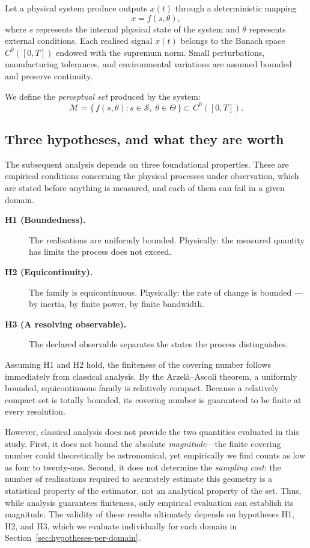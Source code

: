 \documentclass[10pt]{article}
\theoremstyle{plain}
\theoremstyle{definition}
\theoremstyle{remark}
\begin{document}
Let a physical system produce outputs $x(t)$ through a deterministic mapping
\[
x = f(s,\theta),
\]
where $s$ represents the internal physical state of the system and $\theta$ 
represents external conditions. Each realised signal $x(t)$ belongs to the 
Banach space $C^0([0,T])$ endowed with the supremum norm. Small perturbations,
manufacturing tolerances, and environmental variations are assumed bounded and 
preserve continuity.

We define the \emph{perceptual set} produced by the system:
\[
\mathcal{M} = \{\, f(s,\theta) : s\in\mathcal{S},\;\theta \in \Theta \,\}
\subset C^0([0,T]).
\]

\subsection{Three hypotheses, and what they are worth}
\label{sec:hypotheses}

The subsequent analysis depends on three foundational properties. These are
empirical conditions concerning the physical processes under observation, which
are stated before anything is measured, and each of them can fail in a given domain.

\begin{description}
  \item[\textnormal{\textbf{H1 (Boundedness).}}] The realisations are uniformly
    bounded. Physically: the measured quantity has limits the process does not
    exceed.
  \item[\textnormal{\textbf{H2 (Equicontinuity).}}] The family is equicontinuous.
    Physically: the rate of change is bounded --- by inertia, by finite power, by
    finite bandwidth.
  \item[\textnormal{\textbf{H3 (A resolving observable).}}] The declared
    observable separates the states the process distinguishes.
\end{description}

Assuming H1 and H2 hold, the finiteness of the covering number follows
immediately from classical analysis. By the Arzel\`a--Ascoli theorem, a
uniformly bounded, equicontinuous family is relatively compact. Because a
relatively compact set is totally bounded, its covering number is guaranteed
to be finite at every resolution.

However, classical analysis does not provide the two quantities evaluated in
this study. First, it does not bound the absolute \emph{magnitude}---the finite
covering number could theoretically be astronomical, yet empirically we find
counts as low as four to twenty-one. Second, it does not determine the
\emph{sampling cost}: the number of realisations required to accurately
estimate this geometry is a statistical property of the estimator, not an
analytical property of the set. Thus, while analysis guarantees finiteness,
only empirical evaluation can establish its magnitude. The validity of these
results ultimately depends on hypotheses H1, H2, and H3, which we evaluate
individually for each domain in Section~\ref{sec:hypotheses-per-domain}.
\end{document}
